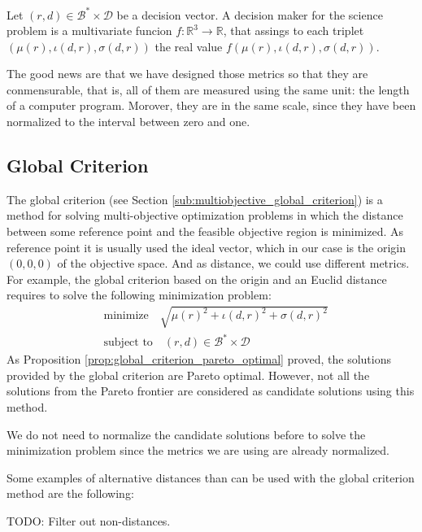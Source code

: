\begin{definition}
Let $(r, d) \in \mathcal{B}^\ast \times \mathcal{D}$ be a decision vector. A decision maker for the science problem is a multivariate funcion $f : \mathbb{R}^3 \rightarrow \mathbb{R}$, that assings to each triplet $\left( \mu(r), \iota(d, r), \sigma(d, r) \right)$ the real value $f\left( \mu(r), \iota(d, r), \sigma(d, r) \right)$. 
\end{definition}

{\color{red} The good news are that we have designed those metrics so that they are conmensurable, that is, all of them are measured using the same unit: the length of a computer program. Morover, they are in the same scale, since they have been normalized to the interval between zero and one.}


\subsection{Global Criterion}

The global criterion (see Section \ref{sub:multiobjective_global_criterion}) is a method for solving multi-objective optimization problems in which the distance between some reference point and the feasible objective region is minimized. As reference point it is usually used the ideal vector, which in our case is the origin $(0, 0, 0)$ of the objective space. And as distance, we could use different metrics. For example, the global criterion based on the origin and an Euclid distance requires to solve the following minimization problem:
\begin{align*}
    & \text{minimize} \quad \sqrt{ \mu(r)^2 + \iota(d, r)^2 + \sigma(d, r)^2 } \\
    & \text{subject to} \quad (r, d) \in \mathcal{B}^\ast \times \mathcal{D}
\end{align*}
As Proposition \ref{prop:global_criterion_pareto_optimal} proved, the solutions provided by the global criterion are Pareto optimal. However, not all the solutions from the Pareto frontier are considered as candidate solutions using this method.

We do not need to normalize the candidate solutions before to solve the minimization problem since the metrics we are using are already normalized.

Some examples of alternative distances than can be used with the global criterion method are the following:

{\color{red} TODO: Filter out non-distances.}

